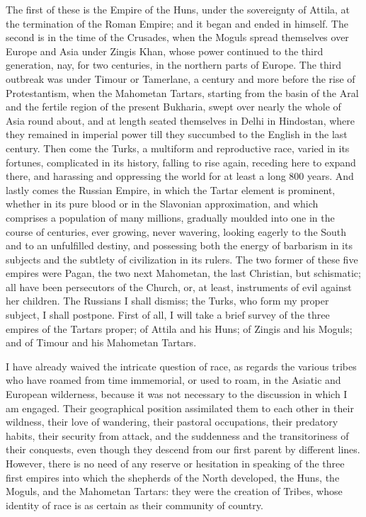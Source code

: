 The first of these is the
Empire of the Huns, under the sovereignty of Attila, at the
termination of the Roman Empire; and it began and ended in himself.
The second is in the time of the Crusades, when the Moguls spread
themselves over Europe and Asia under Zingis Khan, whose power
continued to the third generation, nay, for two centuries, in the
northern parts of Europe. The third outbreak was under Timour or
Tamerlane, a century and more before the rise of Protestantism, when
the Mahometan Tartars, starting from the basin of the Aral and the
fertile region of the present Bukharia, swept over nearly the whole of
Asia round about, and at length seated themselves in Delhi in
Hindostan, where they remained in imperial power till they succumbed
to the English in the last century. Then come the Turks, a multiform
and reproductive race, varied in its fortunes, complicated in its
history, falling to rise again, receding here to expand there, and
harassing and oppressing the world for at least a long 800 years. And
lastly comes the Russian Empire, in which the Tartar element is
prominent, whether in its pure blood or in the Slavonian
approximation, and which comprises a population of many millions,
gradually moulded into one in the course of centuries, ever growing,
never wavering, looking eagerly to the South and to an unfulfilled
destiny, and possessing both the energy of barbarism in its subjects
and the subtlety of civilization in its rulers. The two former of
these five empires were Pagan, the two next Mahometan, the last
Christian, but schismatic; all have been persecutors of the Church,
or, at least, instruments of evil against her children. The
Russians I shall dismiss; the Turks, who form my proper subject, I
shall postpone. First of all, I will take a brief survey of the three
empires of the Tartars proper; of Attila and his Huns; of Zingis and
his Moguls; and of Timour and his Mahometan Tartars.

I have already waived the
intricate question of race, as regards the various tribes who have
roamed from time immemorial, or used to roam, in the Asiatic and
European wilderness, because it was not necessary to the discussion in
which I am engaged. Their geographical position assimilated them to
each other in their wildness, their love of wandering, their pastoral
occupations, their predatory habits, their security from attack, and
the suddenness and the transitoriness of their conquests, even though
they descend from our first parent by different lines. However, there
is no need of any reserve or hesitation in speaking of the three first
empires into which the shepherds of the North developed, the Huns, the
Moguls, and the Mahometan Tartars: they were the creation of Tribes,
whose identity of race is as certain as their community of country.


